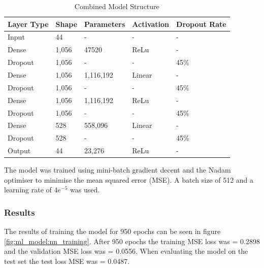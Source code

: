 \begin{table}[!h]
    \centering
    \caption{Combined Model Structure}
    \begin{tabular}{l l l l l }
        \textbf{Layer Type} & \textbf{Shape} & \textbf{Parameters} & \textbf{Activation} & \textbf{Dropout Rate} \\
        \hline
        Input & 44 & - & - & - \\
        \hline
        Dense & 1,056 & 47520 & ReLu  & - \\ 
        \hline
        Dropout & 1,056 & - & - & 45\% \\
        \hline
        Dense & 1,056 & 1,116,192 & Linear  & - \\ 
        \hline
        Dropout & 1,056 & - & - & 45\% \\
        \hline
        Dense & 1,056 & 1,116,192 & ReLu  & - \\ 
        \hline
        Dropout & 1,056 & - & - & 45\% \\
        \hline
        Dense & 528 & 558,096 & Linear  & - \\ 
        \hline
        Dropout & 528 & - & - & 45\% \\
        \hline
        Output & 44 & 23,276 & ReLu & - \\
        \hline
    \end{tabular}
    \label{tab:combined_model_struct}
\end{table}

The model was trained using mini-batch gradient decent and the Nadam optimiser to minimise the mean squared error (MSE). A batch size of 512 and a learning rate of $4e^{-5}$ was used.


\subsubsection{Results}
\FloatBarrier


The results of training the model for 950 epochs can be seen in figure \ref{fig:ml_model:nn_training}. After 950 epochs the training MSE loss was = 0.2898 and the validation MSE loss was = 0.0556. When evaluating the model on the test set the test loss MSE was = 0.0487. 




